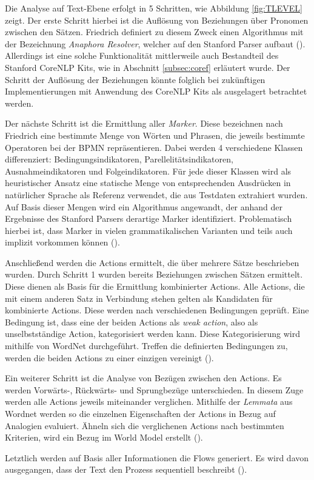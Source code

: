 Die Analyse auf Text-Ebene erfolgt in 5 Schritten, wie Abbildung \ref{fig:TLEVEL} zeigt. Der erste Schritt hierbei ist die Auflösung von Beziehungen über Pronomen zwischen den Sätzen. Friedrich definiert zu diesem Zweck einen Algorithmus mit der Bezeichnung \textit{Anaphora Resolver}, welcher auf den Stanford Parser aufbaut (\cite[vgl.][67 ff.]{FRIEDRICH1}). Allerdings ist eine solche Funktionalität mittlerweile auch Bestandteil des Stanford CoreNLP Kits, wie in Abschnitt \ref{subsec:coref} erläutert wurde. Der Schritt der Auflösung der Beziehungen könnte folglich bei zukünftigen Implementierungen mit Anwendung des CoreNLP Kits als ausgelagert betrachtet werden.\par
Der nächste Schritt ist die Ermittlung aller \textit{Marker}. Diese bezeichnen nach Friedrich eine bestimmte Menge von Wörten und Phrasen, die jeweils bestimmte Operatoren bei der \ac{BPMN} repräsentieren. Dabei werden 4 verschiedene Klassen differenziert:  Bedingungsindikatoren, Parellelitätsindikatoren, Ausnahmeindikatoren und Folgeindikatoren. Für jede dieser Klassen wird als heuristischer Ansatz eine statische Menge von entsprechenden Ausdrücken in natürlicher Sprache als Referenz verwendet, die aus Testdaten extrahiert wurden. Auf Basis dieser Mengen wird ein Algorithmus angewandt, der anhand der Ergebnisse des Stanford Parsers derartige Marker identifiziert. Problematisch hierbei ist, dass Marker in vielen grammatikalischen Varianten und teils auch implizit vorkommen können (\cite[vgl.][73 ff.]{FRIEDRICH1}).\par
Anschließend werden die Actions ermittelt, die über mehrere Sätze beschrieben wurden. Durch Schritt 1 wurden bereits Beziehungen zwischen Sätzen ermittelt. Diese dienen als Basis für die Ermittlung kombinierter Actions. Alle Actions, die mit einem anderen Satz in Verbindung stehen gelten als Kandidaten für kombinierte Actions. Diese werden nach verschiedenen Bedingungen geprüft. Eine Bedingung ist, dass eine der beiden Actions als \textit{weak action}, also als unselbstständige Action, kategorisiert werden kann. Diese Kategorisierung wird mithilfe von WordNet durchgeführt. Treffen die definierten Bedingungen zu, werden die beiden Actions zu einer einzigen vereinigt (\cite[vgl.][77 ff.]{FRIEDRICH1}).\par
Ein weiterer Schritt ist die Analyse von Bezügen zwischen den Actions. Es werden Vorwärts-, Rückwärts- und Sprungbezüge unterschieden. In diesem Zuge werden alle Actions jeweils miteinander verglichen. Mithilfe der \textit{Lemmata} aus Wordnet werden so die einzelnen Eigenschaften der Actions in Bezug auf Analogien evaluiert. Ähneln sich die verglichenen Actions nach bestimmten Kriterien, wird ein Bezug im World Model erstellt (\cite[vgl.][82 ff.]{FRIEDRICH1}).\par
Letztlich werden auf Basis aller Informationen die Flows generiert. Es wird davon ausgegangen, dass der Text den Prozess sequentiell beschreibt (\cite[vgl.][83 ff.]{FRIEDRICH1}).


